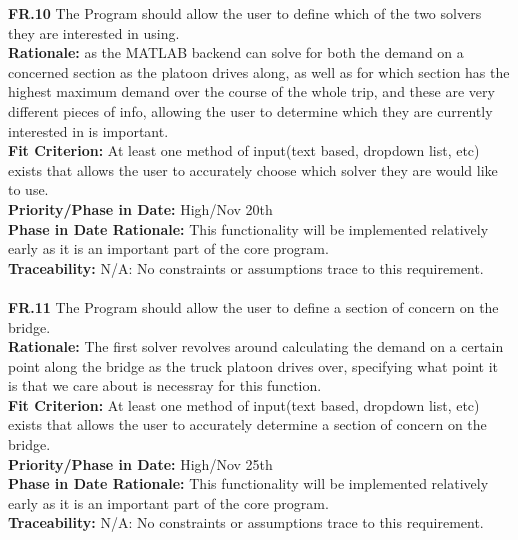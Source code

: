 \documentclass[12pt]{article}
\begin{document}
  \noindent\textbf{FR.10} The Program should allow the user to define which of the two solvers they are interested in using.\\
  \textbf{Rationale:} as the MATLAB backend can solve for both the demand on a concerned section as the platoon drives along, as well as for which section has the 
  highest maximum demand over the course of the whole trip, and these are very different pieces of info, allowing the user to determine which they are currently interested in 
  is important.\\
  \textbf{Fit Criterion:} At least one method of input(text based, dropdown list, etc) exists that allows the user to accurately choose which solver they are would like to use.\\
  \textbf{Priority/Phase in Date:} High/Nov 20th\\
  \textbf{Phase in Date Rationale:} This functionality will be implemented relatively early as it is an important part of the core program.\\
  \textbf{Traceability:} N/A: No constraints or assumptions trace to this requirement.\\\\

  \noindent\textbf{FR.11} The Program should allow the user to define a section of concern on the bridge.\\
  \textbf{Rationale:} The first solver revolves around calculating the demand on a certain point along the bridge as the truck platoon drives over, specifying what point it is
  that we care about is necessray for this function.\\
  \textbf{Fit Criterion:} At least one method of input(text based, dropdown list, etc) exists that allows the user to accurately determine a section of concern on the bridge.\\
  \textbf{Priority/Phase in Date:} High/Nov 25th\\
  \textbf{Phase in Date Rationale:} This functionality will be implemented relatively early as it is an important part of the core program.\\
  \textbf{Traceability:} N/A: No constraints or assumptions trace to this requirement.\\\\
\end{document}
